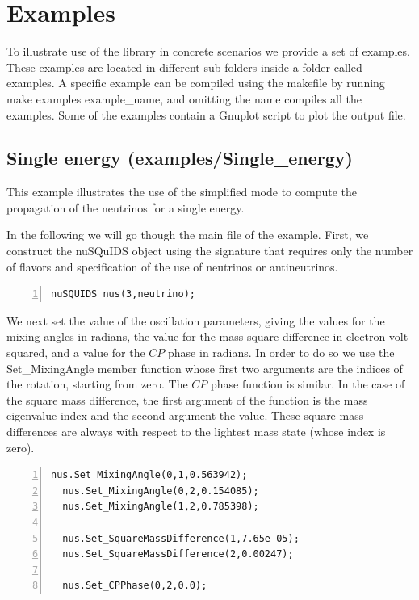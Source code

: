 \documentclass[3p,12pt]{elsarticle}
\newcommand{\ttf}{\ttfamily}
\begin{document}
\section{Examples}
\label{sec:examples}
To illustrate use of the library in concrete scenarios we provide
a set of examples. These examples are located in different sub-folders inside a folder
called {\ttf examples}. A specific example can be compiled using the
makefile by running {\ttf make examples example\_name}, and omitting the
name compiles all the examples. 
Some of the examples contain a {\ttf Gnuplot} script to plot the output file.

\subsection{Single energy \textnormal{({\ttf examples/Single\_energy})}}
\label{sec:single}
This example illustrates the use of the simplified mode to compute the
propagation of the neutrinos for a single energy. 

In the following we will go though the main file of the example.
First, we construct the nuSQuIDS object using the signature that
requires only the number of flavors and specification of the use of
neutrinos or antineutrinos.

\begin{lstlisting}[frame=leftline, numbers = left,breaklines=true, label = ex:sin1]
  nuSQUIDS nus(3,neutrino);
\end{lstlisting}

We next set the value of the oscillation parameters, giving the values for the mixing angles in radians, the value for the mass
square difference in electron-volt squared, and a value for the $CP$
phase in radians.
In order to do so we use the {\ttf Set\_MixingAngle} member function
whose first two arguments are the indices of the rotation, starting
from zero. The $CP$ phase function is similar.
In the case of the square mass difference, the first argument of the function is
the mass eigenvalue index and the second argument the value. These
square mass differences are always with respect to the lightest mass state (whose index is zero).
 
\begin{lstlisting}[frame=leftline, numbers = left,breaklines=true, label = ex:sin1,firstnumber=last]
  nus.Set_MixingAngle(0,1,0.563942);
  nus.Set_MixingAngle(0,2,0.154085);
  nus.Set_MixingAngle(1,2,0.785398);

  nus.Set_SquareMassDifference(1,7.65e-05);
  nus.Set_SquareMassDifference(2,0.00247);

  nus.Set_CPPhase(0,2,0.0);
\end{lstlisting}
\end{document}
